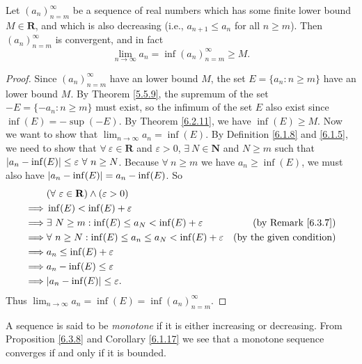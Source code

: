 \begin{additional corollary}\label{ac 6.3.1}
Let \((a_n)_{n = m}^\infty\) be a sequence of real numbers which has some finite lower bound \(M \in \mathbf{R}\), and which is also decreasing (i.e., \(a_{n + 1} \leq a_n\) for all \(n \geq m\)).
Then \((a_n)_{n = m}^\infty\) is convergent, and in fact
\[
    \lim_{n \to \infty} a_n = \inf(a_n)_{n = m}^\infty \geq M.
\]
\end{additional corollary}

\begin{proof}
Since \((a_n)_{n = m}^\infty\) have an lower bound \(M\), the set \(E = \{a_n : n \geq m\}\) have an lower bound \(M\).
By Theorem \ref{5.5.9}, the supremum of the set \(-E = \{-a_n : n \geq m\}\) must exist, so the infimum of the set \(E\) also exist since \(\inf(E) = -\sup(-E)\).
By Theorem \ref{6.2.11}, we have \(\inf(E) \geq M\).
Now we want to show that \(\lim_{n \to \infty} a_n = \inf(E)\).
By Definition \ref{6.1.8} and \ref{6.1.5}, we need to show that \(\forall\ \varepsilon \in \mathbf{R}\) and \(\varepsilon > 0\), \(\exists\ N \in \mathbf{N}\) and \(N \geq m\) such that \(\abs*{a_n - \inf(E)} \leq \varepsilon \ \forall\ n \geq N\).
Because \(\forall\ n \geq m\) we have \(a_n \geq \inf(E)\), we must also have \(\abs*{a_n - \inf(E)} = a_n - \inf(E)\).
So
\begin{align*}
& (\forall\ \varepsilon \in \mathbf{R}) \land (\varepsilon > 0) \\
\implies & \inf(E) < \inf(E) + \varepsilon \\
\implies & \exists\ N \geq m : \inf(E) \leq a_N < \inf(E) + \varepsilon & \text{(by Remark \ref{6.3.7})} \\
\implies & \forall\ n \geq N : \inf(E) \leq a_n \leq a_N < \inf(E) + \varepsilon & \text{(by the given condition)} \\
\implies & a_n \leq \inf(E) + \varepsilon \\
\implies & a_n - \inf(E) \leq \varepsilon \\
\implies & \abs*{a_n - \inf(E)} \leq \varepsilon.
\end{align*}
Thus \(\lim_{n \to \infty} a_n = \inf(E) = \inf(a_n)_{n = m}^\infty\).
\end{proof}

\begin{note}
A sequence is said to be \emph{monotone} if it is either increasing or decreasing.
From Proposition \ref{6.3.8} and Corollary \ref{6.1.17} we see that a monotone sequence converges if and only if it is bounded.
\end{note}


